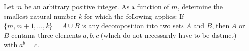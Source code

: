 Let $m$ be an arbitrary positive integer.
As a function of $m$, determine the smallest natural number $k$ for which the following applies:
If $\{m, m+1, \ldots , k\} = A \cup B$ is any decomposition into two sets $A$ and $B$,
then $A$ or $B$ contains three elements $a, b, c$ (which do not
necessarily have to be distinct) with $a^{b} = c$.